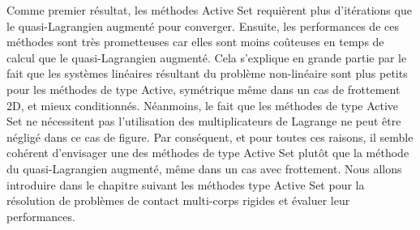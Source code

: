 Comme premier résultat, les méthodes Active Set requièrent plus d'itérations que le quasi-Lagrangien augmenté pour converger. Ensuite, les performances de ces méthodes sont très prometteuses car elles sont moins coûteuses en temps de calcul que le quasi-Lagrangien augmenté. Cela s'explique en grande partie par le fait que les systèmes linéaires résultant du problème non-linéaire sont plus petits pour les méthodes de type Active, symétrique même dans un cas de frottement 2D, et mieux conditionnés. Néanmoins, le fait que les méthodes de type Active Set ne nécessitent pas l'utilisation des multiplicateurs de Lagrange ne peut être négligé dans ce cas de figure. Par conséquent, et pour toutes ces raisons, il semble cohérent d'envisager une des méthodes de type Active Set plutôt que la méthode du quasi-Lagrangien augmenté, même dans un cas avec frottement. Nous allons introduire dans le chapitre suivant les méthodes type Active Set pour la résolution de problèmes de contact multi-corps rigides et évaluer leur performances.

